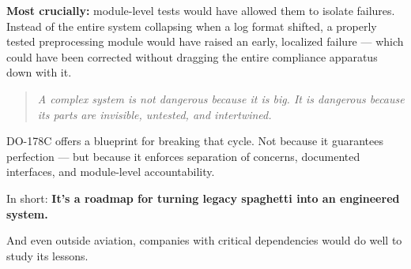     \textbf{Most crucially:} module-level tests would have allowed them to isolate failures.  
    Instead of the entire system collapsing when a log format shifted, a properly tested preprocessing module would have raised an early, localized failure — which could have been corrected without dragging the entire compliance apparatus down with it.
    
    \medskip
    
    \begin{quote}
    \textit{A complex system is not dangerous because it is big.
    It is dangerous because its parts are invisible, untested, and intertwined.}
    \end{quote}
    
    DO-178C offers a blueprint for breaking that cycle.  
    Not because it guarantees perfection — but because it enforces separation of concerns, documented interfaces, and module-level accountability.
    
    \medskip
    
    In short:  
    \textbf{It’s a roadmap for turning legacy spaghetti into an engineered system.}
    
    And even outside aviation, companies with critical dependencies would do well to study its lessons.
    












